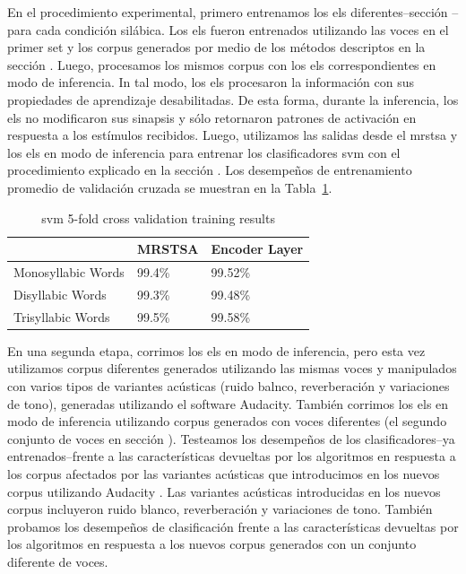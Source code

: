 En el procedimiento experimental, primero entrenamos los \glspl{el} diferentes--sección --para cada condición silábica. Los \glspl{el}  fueron entrenados utilizando las voces en el primer set y los corpus generados por medio de los métodos descriptos en la sección . Luego, procesamos los mismos corpus con los \glspl{el} correspondientes en modo de inferencia. In tal modo, los \glspl{el} procesaron la información con sus propiedades de aprendizaje desabilitadas. De esta forma, durante la inferencia, los \glspl{el} no modificaron sus sinapsis y sólo retornaron patrones de activación en respuesta a los estímulos recibidos. Luego, utilizamos las salidas desde el \gls{mrstsa} y los \glspl{el} en modo de inferencia para entrenar los clasificadores \gls{svm} con el procedimiento explicado en la sección . Los desempeños de entrenamiento promedio de validación cruzada se muestran en la Tabla~\ref{SVM_Training}.

\begin{table}[h!]
\centering
\caption{\gls{svm} 5-fold cross validation training results}
\begin{tabular}{|l|l|l|}
\hline
		   & MRSTSA & Encoder Layer \\ \hline
Monosyllabic Words & 99.4\% & 99.52\%          \\ \hline
Disyllabic Words   & 99.3\%   & 99.48\%        \\ \hline
Trisyllabic Words  & 99.5\% & 99.58\%          \\ \hline
\end{tabular}
\label{SVM_Training}
\end{table}

En una segunda etapa, corrimos los \glspl{el} en modo de inferencia, pero esta vez utilizamos corpus diferentes generados utilizando las mismas voces y manipulados con varios tipos de variantes acústicas (ruido balnco, reverberación y variaciones de tono), generadas utilizando el software Audacity. También corrimos los \glspl{el} en modo de inferencia utilizando corpus generados con voces diferentes (el segundo conjunto de voces en sección ). Testeamos los desempeños de los clasificadores--ya entrenados--frente a las características devueltas por los algoritmos en respuesta a los corpus afectados por las variantes acústicas que introducimos en los nuevos corpus utilizando Audacity \cite{audacity}. Las variantes acústicas introducidas en los nuevos corpus incluyeron ruido blanco, reverberación y variaciones de tono. También probamos los desempeños de clasificación frente a las características devueltas por los algoritmos en respuesta a los nuevos corpus generados con un conjunto diferente de voces.







